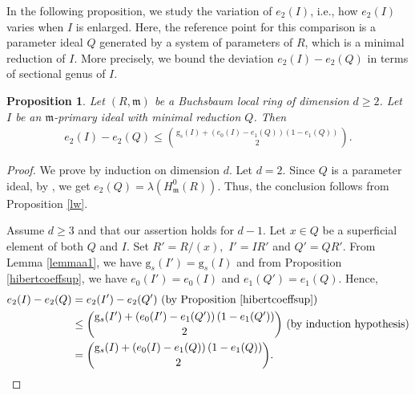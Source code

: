 \documentclass[reqno,a4paper,dvipsnames]{amsart}
\newcommand{\m}{\mathfrak{m} }
\newtheorem{proposition}[theorem]{Proposition}
\theoremstyle{definition}
\begin{document}
In the following proposition, we study the variation of $e_{2}(I)$, i.e., how $e_{2}(I)$ varies when $I$ is enlarged. Here, the reference point for this comparison is a parameter ideal $Q$ generated by a system of parameters of $R$, which is a minimal reduction of $I.$ More precisely, we bound the deviation $e_{2}(I)-e_2(Q)$ in terms of sectional genus of $I.$

\begin{proposition} \label{deviationbound} 
    Let $(R,\m)$ be a Buchsbaum local ring of dimension $d \geq 2$. Let $I$ be an $\m$-primary ideal with minimal reduction $Q$. Then
    \begin{eqnarray}   \label{eqn-mum}
    e_{2}(I)-e_{2}(Q) \leq \binom{\mathrm{g}_{s}(I)+(e_{0}(I)-e_{1}(Q))\left(1-e_{1}(Q)\right)}{2}.
    \end{eqnarray}
\end{proposition}
\begin{proof}
        We prove by induction on dimension $d$. 
        Let  $d=2$.  Since $Q$ is a parameter ideal,  by \cite[Corollary 4.2]{trung3}, we get $e_{2}(Q)=\lambda\left(H_{\m}^{0}(R)\right).$ Thus, the conclusion follows from Proposition \ref{lw}. 

        Assume $d \geq 3$ and that our assertion holds for $d-1.$ 
         Let $x\in Q$ be a superficial element of both $Q$ and $I.$ Set $R'=R/(x),$ $I'=IR'$ and $Q'=QR'.$  From Lemma \ref{lemmaa1}, we have $\mathrm{g}_{s}(I')=\mathrm{g}_{s}(I)$ and from Proposition \ref{hibertcoeffsup}, we have $e_{0}(I')=e_{0}(I)$ and $e_{1}(Q')=e_{1}(Q)$.
        Hence,
        \begin{align*}
            e_{2}(I)-e_{2}(Q)
            &=e_{2}(I')-e_{2}(Q') 
            \text{ (by Proposition \ref{hibertcoeffsup})}\\
            &\leq \binom{\mathrm{g}_{s}(I')+(e_{0}(I')-e_{1}(Q'))\left(1-e_{1}(Q')\right)}{2} \text{ (by induction hypothesis)}\\
            &=  \binom{\mathrm{g}_{s}(I)+(e_{0}(I)-e_{1}(Q))\left(1-e_{1}(Q)\right)}{2}.   \qedhere
        \end{align*}
\end{proof}
\end{document}
